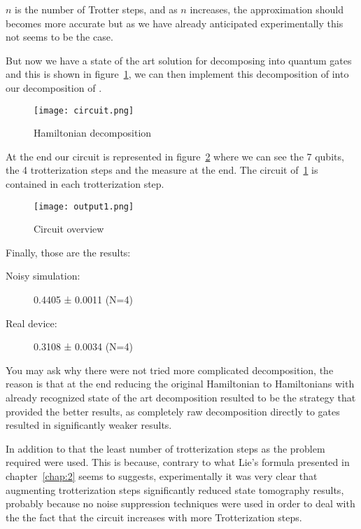 $n$ is the number of Trotter steps, and as $n$ increases, the approximation should becomes more accurate but as we have already anticipated experimentally this not seems to be the case.

But now we have a state of the art solution for decomposing  into quantum gates~\cite{s1} \cite{s2} and this is shown in figure~\ref{fig:solution}, we can then implement this decomposition of  into our decomposition of .

\begin{figure}[htb]
    \texttt{[image: circuit.png]}
    \centering
    \caption{Hamiltonian decomposition}
    \label{fig:solution}
\end{figure}


At the end our circuit is represented in figure~\ref{fig:circuit} where we can see the 7 qubits, the 4 trotterization steps and the measure at the end. The circuit of~\ref{fig:solution} is contained in each trotterization step. 
\begin{figure}[htb]
    \texttt{[image: output1.png]}
    \centering
    \caption{Circuit overview}
    \label{fig:circuit}
\end{figure}

Finally, those are the results:
\begin{description}
    \item[Noisy simulation: ]0.4405 ± 0.0011 (N=4)
    \item[Real device: ]0.3108 ± 0.0034 (N=4)
    \end{description}

    You may ask why there were not tried more complicated decomposition, the reason is that at the end reducing the original Hamiltonian to Hamiltonians with already recognized state of the art decomposition resulted to be the strategy that provided the better results, as completely raw decomposition directly to gates resulted in significantly weaker results.

    In addition to that the least number of trotterization steps as the problem required were used. This is because, contrary to what Lie's formula presented in chapter~\ref{chap:2} seems to suggests, experimentally it was very clear that augmenting trotterization steps significantly reduced state tomography results, probably because no noise suppression techniques were used in order to deal with the the fact that the circuit increases with more Trotterization steps.
